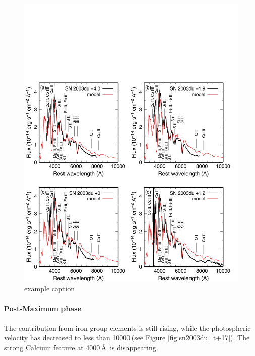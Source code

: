 \begin{figure}[htbp] %
   \centering
   \includegraphics[width=\textwidth]{chapter_intro/plots/sn2003du_t0.pdf} 
   \caption{example caption}
   \label{fig:sn2003du_t0}
\end{figure}

\paragraph{Post-Maximum phase}
The contribution from iron-group elements is still rising, while the photospheric velocity has decreased to less than 10000\,\kms (see Figure \ref{fig:sn2003du_t+17}). The strong Calcium feature at 4000\,\AA\ is disappearing. 


